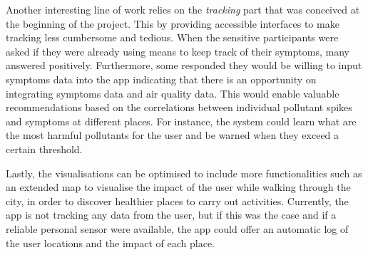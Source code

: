 Another interesting line of work relies on the \textit{tracking} part that was conceived at the beginning of the project. This by providing accessible interfaces to make tracking less cumbersome and tedious. When the sensitive participants were asked if they were already using means to keep track of their symptoms, many answered positively. Furthermore, some responded they would be willing to input symptoms data into the app indicating that there is an opportunity on integrating symptoms data and air quality data. This would enable valuable recommendations based on the correlations between individual pollutant spikes and symptoms at different places. For instance, the system could learn what are the most harmful pollutants for the user and be warned when they exceed a certain threshold.

Lastly, the visualisations can be optimised to include more functionalities such as an extended map to visualise the impact of the user while walking through the city, in order to discover healthier places to carry out activities. Currently, the app is not tracking any data from the user, but if this was the case and if a reliable personal sensor were available, the app could offer an automatic log of the user locations and the impact of each place. 